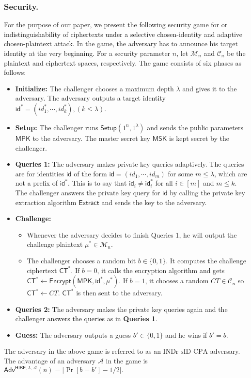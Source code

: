\documentclass[runningheads]{llncs}
\begin{document}
\subsubsection{Security.} 
For the purpose of our paper, we present  
the following security  game for  or indistinguishability of ciphertexts under a selective chosen-identity and adaptive chosen-plaintext attack.  
In the game, the adversary  has to announce his target identity at the very beginning.
For a security parameter $n$, let $\mathcal{M}_{n}$ and $\mathcal{C}_n$  be 
the plaintext and ciphertext spaces, respectively. The game consists of six phases as follows:
\begin{itemize}
	\item \textbf{Initialize:} 
 The challenger chooses a maximum depth $\lambda$ and gives it to the adversary. The adversary outputs a target identity $\mathsf{id}^*=(id^*_1,\cdots, id^*_k), (k\leq \lambda)$.  
	\item \textbf{Setup:}
		The challenger runs $ \mathsf{Setup}( 1^{n}, 1^{\lambda})$ and sends the public parameters $\mathsf{MPK}$ to the adversary. The master secret key $\mathsf{MSK}$ is kept secret by the challenger. 
	\item \textbf{Queries 1:} The adversary makes private key queries adaptively. 
	The queries are for  identities $\mathsf{id}$ of the form $\mathsf{id}=(id_1,\cdots, id_m)$ 
	for some $m\leq \lambda$, which are not a prefix of $\mathsf{id}^*$.
	This is to say that $\mathsf{id}_i\neq \mathsf{id}^*_i$ for all $i\in[m]$ and $m\leq k$.
	The challenger answers the private key query for $\mathsf{id}$ by calling the 
	private key extraction algorithm $\mathsf{Extract}$ and sends 
	the key to the adversary.
	\item \textbf{Challenge:} 
	\begin{itemize}
		\item Whenever the adversary decides to finish Queries 1, 
			he  will output the challenge plaintext $\mu^* \in \mathcal{M}_n$.  
		\item The challenger chooses a random bit $b \in \{0,1 \}$. 
			It computes the challenge  ciphertext $\mathsf{CT}^*$. 
			If $b=0$, it calls the encryption algorithm and gets   
			$\mathsf{CT}^* \leftarrow \mathsf{Encrypt}(\mathsf{MPK},\mathsf{id}^*,\mu^*)$. 
			If $b=1$,  it chooses a random $CT \in \mathcal{C}_n$ so
			$ \mathsf{CT}^*  \leftarrow CT$. 
			$ \mathsf{CT}^*$ is then sent to the adversary.
	\end{itemize}
	\item \textbf{Queries 2:}
	The adversary makes the private key queries again and the challenger answers the queries as in \textbf{Queries 1}.
	\item \textbf{Guess:}  The adversary outputs a guess $b' \in \{0,1 \}$ and he wins if $b'=b$.
	
	
\end{itemize}
The adversary in the above game is referred to as an $\text{INDr-sID-CPA}$ adversary. The advantage of an adversary $\mathcal{A}$ in the  game is 
$\mathsf{Adv}^{\mathsf{HIBE}, \lambda,\mathcal{A}}(n)=|\Pr[b=b']-1/2|.$
\end{document}
